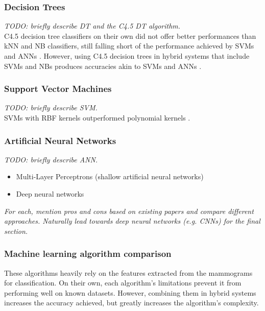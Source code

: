 \subsubsection{Decision Trees}

\textit{TODO: briefly describe DT and the C4.5 DT algorithm.}\\

C4.5 decision tree classifiers on their own did not offer better performances than kNN and NB classifiers, still falling short of the performance achieved by SVMs and ANNs \cite{Yue2018} \cite{Asri2016}. However, using C4.5 decision trees in hybrid systems that include SVMs and NBs produces accuracies akin to SVMs and ANNs \cite{Yue2018}.

\subsubsection{Support Vector Machines}

\textit{TODO: briefly describe SVM.}\\

SVMs with RBF kernels outperformed polynomial kernels \cite{Osareh2010}.

\subsubsection{Artificial Neural Networks}

\textit{TODO: briefly describe ANN.}\\

\begin{itemize}
    \item Multi-Layer Perceptrons (shallow artificial neural networks)
    \item Deep neural networks
\end{itemize}

\textit{For each, mention pros and cons based on existing papers and compare different approaches. Naturally lead towards deep neural networks (e.g. CNNs) for the final section.}

\subsubsection{Machine learning algorithm comparison}

These algorithms heavily rely on the features extracted from the mammograms for classification. On their own, each algorithm's limitations prevent it from performing well on known datasets. However, combining them in hybrid systems increases the accuracy achieved, but greatly increases the algorithm's complexity.


